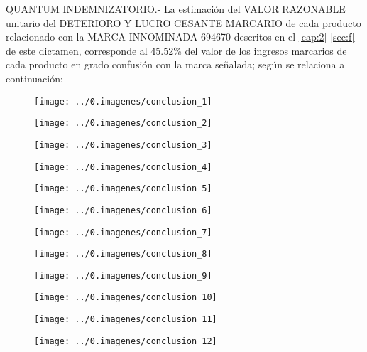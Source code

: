 \textcolor{principal}{\underline{QUANTUM INDEMNIZATORIO.-}} La estimación del VALOR RAZONABLE unitario del DETERIORO Y LUCRO CESANTE MARCARIO de cada producto relacionado con la MARCA INNOMINADA 694670 descritos en el \autoref{cap:2} \autoref{sec:f} de este dictamen, corresponde al 45.52\% del valor de los ingresos marcarios de cada producto en grado confusión con la marca señalada; según se relaciona a continuación:\\

\begin{figure}[H]
\centering
\texttt{[image: ../0.imagenes/conclusion\_1]}
\end{figure}

\begin{figure}[H]
\centering
\texttt{[image: ../0.imagenes/conclusion\_2]}
\end{figure}

\begin{figure}[H]
\centering
\texttt{[image: ../0.imagenes/conclusion\_3]}
\end{figure}

\begin{figure}[H]
\centering
\texttt{[image: ../0.imagenes/conclusion\_4]}
\end{figure}

\begin{figure}[H]
\centering
\texttt{[image: ../0.imagenes/conclusion\_5]}
\end{figure}

\begin{figure}[H]
\centering
\texttt{[image: ../0.imagenes/conclusion\_6]}
\end{figure}

\begin{figure}[H]
\centering
\texttt{[image: ../0.imagenes/conclusion\_7]}
\end{figure}

\begin{figure}[H]
\centering
\texttt{[image: ../0.imagenes/conclusion\_8]}
\end{figure}

\begin{figure}[H]
\centering
\texttt{[image: ../0.imagenes/conclusion\_9]}
\end{figure}

\begin{figure}[H]
\centering
\texttt{[image: ../0.imagenes/conclusion\_10]}
\end{figure}

\begin{figure}[H]
\centering
\texttt{[image: ../0.imagenes/conclusion\_11]}
\end{figure}

\begin{figure}[H]
\centering
\texttt{[image: ../0.imagenes/conclusion\_12]}
\end{figure}

